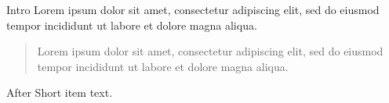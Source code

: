 \documentclass[11pt]{article}
\begin{document}
Intro Lorem ipsum dolor sit amet, consectetur adipiscing elit, sed do eiusmod tempor incididunt ut labore et dolore magna aliqua.
\begin{quote}
Lorem ipsum dolor sit amet, consectetur adipiscing elit, sed do eiusmod tempor incididunt ut labore et dolore magna aliqua.
\end{quote}
After Short item text.
\end{document}
